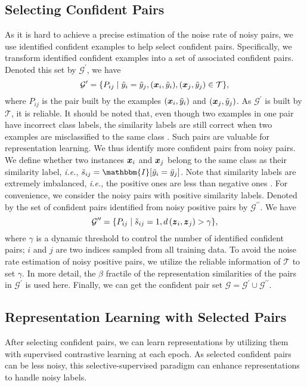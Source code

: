 \documentclass[10pt,twocolumn,letterpaper]{article}
\newcommand{\bm}[1]{\mbox{\boldmath{$#1$}}}
\begin{document}
\subsection{Selecting Confident Pairs}
As it is hard to achieve a precise estimation of the noise rate of noisy pairs, we use identified confident examples to help select confident pairs. Specifically, we transform identified confident examples into a set of associated confident pairs.  Denoted this set by $\mathcal{G}^{\prime}$, we have 
\begin{equation}
	\mathcal{G}^{\prime}=\{P_{ij}\mid \tilde{y}_{i} = \tilde{y}_{j}, (\bm{x}_i,\tilde{y}_i), (\bm{x}_j,\tilde{y}_j) \in \mathcal{T} \}, 
	\label{simi_label1}
\end{equation}
where $P_{ij}$ is the pair built by the examples $(\bm{x}_i,\tilde{y}_i)$ and $(\bm{x}_j,\tilde{y}_j)$. As $\mathcal{G}^{\prime}$ is built by $\mathcal{T}$, it is reliable. It should be noted that, even though two examples in one pair have incorrect class labels, the similarity labels are still correct when two examples are misclassified to the same class \cite{Wu2021icml}. Such pairs are valuable for representation learning. We thus identify more confident pairs from noisy pairs. We define whether two instances $\bm{x}_i$ and $\bm{x}_j$ belong to the same class as their similarity label, \textit{i.e.}, $\tilde{s}_{ij}=\mathbbm{I}[\tilde{y}_{i} = \tilde{y}_{j}]$. Note that similarity labels are extremely imbalanced, \textit{i.e.}, the positive ones are less than negative ones \cite{Wu2021icml}. For convenience, we consider the noisy pairs with positive similarity labels. Denoted by the set of confident pairs identified from noisy positive pairs by $\mathcal{G}^{\prime\prime}$. We have 
\begin{equation}
	\mathcal{G}^{\prime\prime}=\{P_{ij}\mid \tilde{s}_{ij}=1, d\left(\bm{z}_{i}, \bm{z}_{j}\right)>\gamma \},
	\label{simi_label2}
\end{equation}
where $\gamma$ is a dynamic threshold to control the number of identified confident pairs; $i$ and $j$ are two indices sampled from all training data. To avoid the noise rate estimation of noisy positive pairs, we utilize the reliable information of $\mathcal{T}$ to set $\gamma$. In more detail, the $\beta$ fractile of the representation similarities of the pairs in $\mathcal{G}^{\prime}$ is used here. Finally, we can get the confident pair set $\mathcal{G}= \mathcal{G}^{\prime} \cup \mathcal{G}^{\prime\prime}$. 
\subsection{Representation Learning with Selected Pairs}
After selecting confident pairs, we can learn representations by utilizing them with supervised contrastive learning at each epoch. As selected confident pairs can be less noisy, this selective-supervised paradigm can enhance representations to handle noisy labels.
\end{document}
